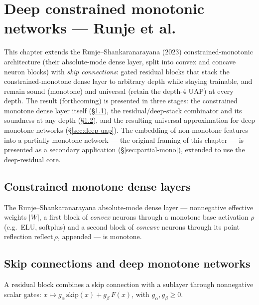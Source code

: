 \chapter{Deep constrained monotonic networks --- Runje et al.}

This chapter extends the Runje--Shankaranarayana (2023) constrained-monotonic architecture (their
absolute-mode dense layer, split into convex and concave neuron blocks) with \emph{skip
connections}: gated residual blocks that stack the constrained-monotone dense layer to arbitrary
depth while staying trainable, and remain sound (monotone) and universal (retain the depth-4 UAP)
at every depth. The result (forthcoming) is presented in three stages: the constrained monotone
dense layer itself (\S\ref{sec:rs-dense}), the residual/deep-stack combinator and its soundness at
any depth (\S\ref{sec:skip}), and the resulting universal approximation for deep monotone networks
(\S\ref{sec:deep-uap}). The embedding of non-monotone features into a partially monotone network
--- the original framing of this chapter --- is presented as a secondary application
(\S\ref{sec:partial-mono}), extended to use the deep-residual core.

\section{Constrained monotone dense layers}\label{sec:rs-dense}

\begin{lemma}\label{lem:rs-dense}
  \leanok
  The Runje--Shankaranarayana absolute-mode dense layer --- nonnegative effective weights $|W|$,
  a first block of \emph{convex} neurons through a monotone base activation $\rho$ (e.g.\ ELU,
  softplus) and a second block of \emph{concave} neurons through its point reflection
  $\mathrm{reflect}\,\rho$, appended --- is monotone.
\end{lemma}

\section{Skip connections and deep monotone networks}\label{sec:skip}

\begin{definition}\label{def:residual}
  \leanok
  A residual block combines a skip connection with a sublayer through nonnegative scalar gates:
  $x \mapsto g_\alpha\,\mathrm{skip}(x) + g_\beta\,F(x)$, with $g_\alpha,g_\beta \ge 0$.
\end{definition}

